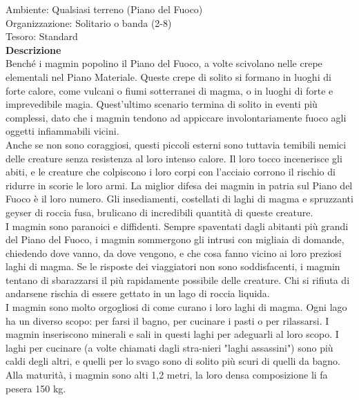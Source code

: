 \begin{multicols}{2}
Ambiente: Qualsiasi terreno (Piano del Fuoco)\\
Organizzazione: Solitario o banda (2-8)\\
Tesoro: Standard\\
\textbf{Descrizione}\\
Benché i magmin popolino il Piano del Fuoco, a volte scivolano nelle crepe elementali nel Piano Materiale. Queste crepe di solito si formano in luoghi di forte calore, come vulcani o fiumi sotterranei di magma, o in luoghi di forte e imprevedibile magia. Quest'ultimo scenario termina di solito in eventi più complessi, dato che i magmin tendono ad appiccare involontariamente fuoco agli oggetti infiammabili vicini.\\

Anche se non sono coraggiosi, questi piccoli esterni sono tuttavia temibili nemici delle creature senza resistenza al loro intenso calore. Il loro tocco incenerisce gli abiti, e le creature che colpiscono i loro corpi con l'acciaio corrono il rischio di ridurre in scorie le loro armi. La miglior difesa dei magmin in patria sul Piano del Fuoco è il loro numero. Gli insediamenti, costellati di laghi di magma e spruzzanti geyser di roccia fusa, brulicano di incredibili quantità di queste creature.\\

I magmin sono paranoici e diffidenti. Sempre spaventati dagli abitanti più grandi del Piano del Fuoco, i magmin sommergono gli intrusi con migliaia di domande, chiedendo dove vanno, da dove vengono, e che cosa fanno vicino ai loro preziosi laghi di magma. Se le risposte dei viaggiatori non sono soddisfacenti, i magmin tentano di sbarazzarsi il più rapidamente possibile delle creature. Chi si rifiuta di andarsene rischia di essere gettato in un lago di roccia liquida.\\

I magmin sono molto orgogliosi di come curano i loro laghi di magma. Ogni lago ha un diverso scopo: per farsi il bagno, per cucinare i pasti o per rilassarsi. I magmin inseriscono minerali e sali in questi laghi per adeguarli al loro scopo. I laghi per cucinare (a volte chiamati dagli stra-nieri "laghi assassini") sono più caldi degli altri, e quelli per lo svago sono di solito più scuri di quelli da bagno.\\

Alla maturità, i magmin sono alti 1,2 metri, la loro densa composizione li fa pesera 150 kg.\\


\end{multicols}
